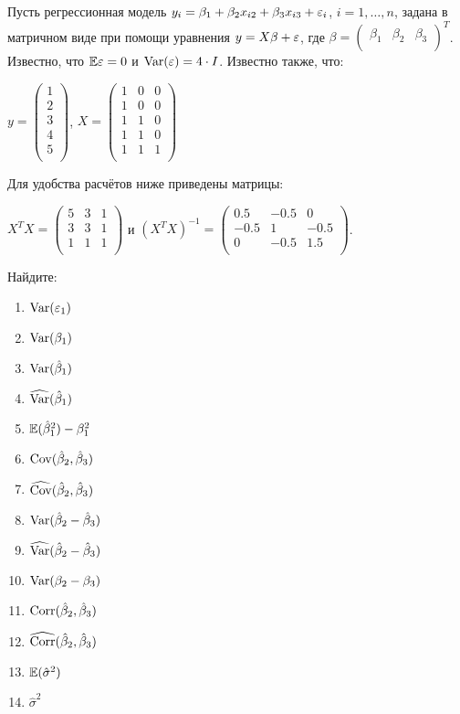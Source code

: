 \begin{problem}
Пусть регрессионная модель $y_i = \beta_1 + \beta_2 x_{i2} + \beta_3 x_{i3} + \varepsilon_i$, $i = 1, \ldots, n$, задана в матричном виде при помощи уравнения $y = X \beta + \varepsilon$, где $\beta =  \begin{pmatrix}
\beta_1 & \beta_2 & \beta_3\\
\end{pmatrix} ^T$. Известно, что $\mathbb{E} \varepsilon = 0$ и $\operatorname{Var} (\varepsilon) = 4 \cdot I$. Известно также, что:

$y =  \begin{pmatrix}
1 \\
2 \\
3 \\
4 \\
5 \\
\end{pmatrix} $, $X =  \begin{pmatrix}
1 & 0 & 0 \\
1 & 0 & 0 \\
1 & 1 & 0 \\
1 & 1 & 0 \\
1 & 1 & 1 \\
\end{pmatrix} $

Для удобства расчётов ниже приведены матрицы:

$X^T X =  \begin{pmatrix}
5 & 3 & 1 \\
3 & 3 & 1 \\
1 & 1 & 1 \\
\end{pmatrix} $ и $(X^T X)^{-1} =  \begin{pmatrix}
0.5 & -0.5 & 0 \\
-0.5 & 1 & -0.5 \\
0 & -0.5 & 1.5 \\
\end{pmatrix} $.

Найдите:
\begin{enumerate}
\item $\operatorname{Var} (\varepsilon_1)$
\item $\operatorname{Var} (\beta_1)$
\item $\operatorname{Var} (\hat{\beta}_1)$
\item $\widehat{\operatorname{Var} }(\hat{\beta}_1)$
\item $\mathbb{E} (\hat{\beta}_1^2) - \beta_1^2$
\item $\operatorname{Cov} (\hat{\beta}_2, \hat{\beta}_3)$
\item $\widehat{\operatorname{Cov} }(\hat{\beta}_2, \hat{\beta}_3)$
\item $\operatorname{Var} (\hat{\beta}_2 - \hat{\beta}_3)$
\item $\widehat{\operatorname{Var} }(\hat{\beta}_2 - \hat{\beta}_3)$
\item $\operatorname{Var} (\beta_2 - \beta_3)$
\item $\operatorname{Corr} (\hat{\beta}_2, \hat{\beta}_3)$
\item $\widehat{\operatorname{Corr}}(\hat{\beta}_2, \hat{\beta}_3)$
\item $\mathbb{E} (\hat{\sigma}^2)$
\item $\hat{\sigma}^2$
\end{enumerate}
\end{problem}
\begin{solution}
\end{solution}



